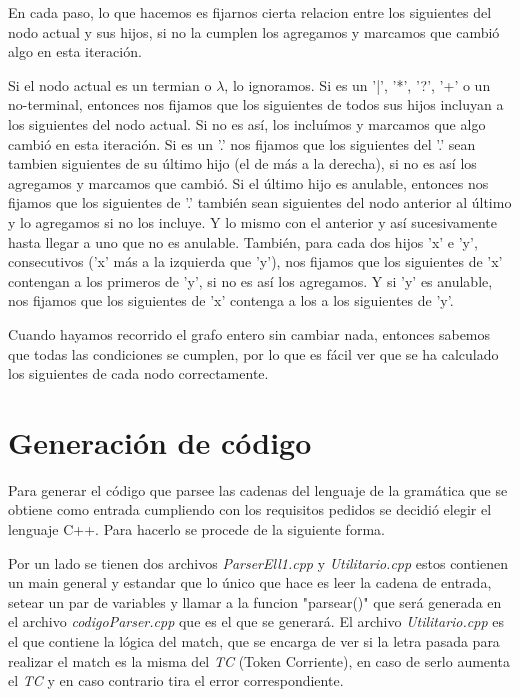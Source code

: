 \documentclass[a4paper]{report}
\begin{document}
	En cada paso, lo que hacemos es fijarnos cierta relacion entre los
siguientes del nodo actual y sus hijos, si no la cumplen los agregamos y marcamos que
cambió algo en esta iteración.


	Si el nodo actual es un termian o $\lambda$, lo ignoramos. Si es un '|',
'*', '?', '+' o un no-terminal, entonces nos fijamos que los siguientes de todos
sus hijos incluyan a los siguientes del nodo actual. Si no es así, los incluímos
y marcamos que algo cambió en esta iteración. Si es un '.' nos fijamos que los
siguientes del '.' sean tambien siguientes de su último hijo (el de más a la
derecha), si no es así los agregamos y marcamos que cambió. Si el último hijo es
anulable, entonces nos fijamos que los siguientes de '.' también sean siguientes
del nodo anterior al último y lo agregamos si no los incluye. Y lo mismo con el
anterior y así sucesivamente hasta llegar a uno que no es anulable. También,
para cada dos hijos 'x' e 'y', consecutivos ('x' más a la izquierda que 'y'),
nos fijamos que los siguientes de 'x' contengan a los primeros de 'y', si no es
así los agregamos. Y si 'y' es anulable, nos fijamos que los siguientes de 'x'
contenga a los a los siguientes de 'y'.


	Cuando hayamos recorrido el grafo entero sin cambiar nada, entonces
sabemos que todas las condiciones se cumplen, por lo que es fácil ver que se ha
calculado los siguientes de cada nodo correctamente.


\section*{Generación de código}


Para generar el código que parsee las cadenas del lenguaje de la gramática que se 
obtiene como entrada cumpliendo con los requisitos pedidos se decidió elegir el lenguaje C++. Para hacerlo se procede de la siguiente forma.


Por un lado se tienen dos archivos \emph{ParserEll1.cpp} y \emph{Utilitario.cpp} estos contienen un main general y estandar
que lo único que hace es leer la cadena de entrada, setear un par de variables y llamar a la funcion "parsear()" 
que será generada en el archivo \emph{codigoParser.cpp} que es el que se generará. El archivo \emph{Utilitario.cpp} 
es el que contiene la lógica del match, que se encarga de ver si la letra pasada para realizar el match es la misma del \emph{TC} 
(Token Corriente), en caso de serlo aumenta el \emph{TC} y en caso contrario tira el error correspondiente.
\end{document}
